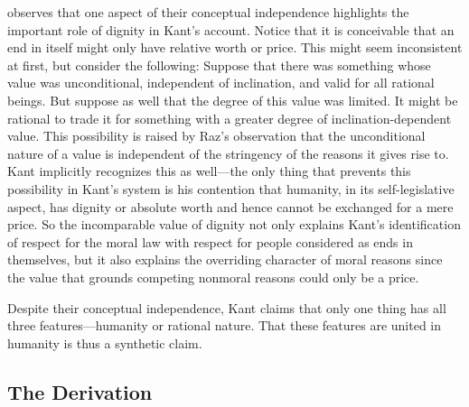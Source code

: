 \documentclass[a4paper,12pt]{article}
\begin{document}
\citet{Wood:1999zy} observes that one aspect of their conceptual independence highlights the important role of dignity in Kant's account. Notice that it is conceivable that an end in itself might only have relative worth or price. This might seem inconsistent at first, but consider the following: Suppose that there was something whose value was unconditional, independent of inclination, and valid for all rational beings. But suppose as well that the degree of this value was limited. It might be rational to trade it for something with a greater degree of inclination-dependent value. This possibility is raised by Raz's \citeyearpar{Raz:2001ps} observation that the unconditional nature of a value is independent of the stringency of the reasons it gives rise to. Kant implicitly recognizes this as well---the only thing that prevents this possibility in Kant's system is his contention that humanity, in its self-legislative aspect, has dignity or absolute worth and hence cannot be exchanged for a mere price. So the incomparable value of dignity not only explains Kant's identification of respect for the moral law with respect for people considered as ends in themselves, but it also explains the overriding character of moral reasons since the value that grounds competing nonmoral reasons could only be a price.

Despite their conceptual independence, Kant claims that only one thing has all three features---humanity or rational nature. That these features are united in humanity is thus a synthetic claim.


\subsection{The Derivation} \label{sub:the_derivation} %
\end{document}
